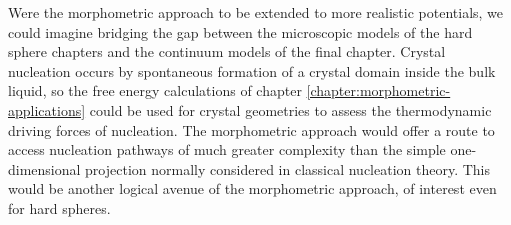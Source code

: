 \documentclass[11pt,twoside]{report}
\def\includebibliography{}
\begin{document}
Were the morphometric approach to be extended to more realistic potentials, we could imagine bridging the gap between the microscopic models of the hard sphere chapters and the continuum models of the final chapter.
Crystal nucleation occurs by spontaneous formation of a crystal domain inside the bulk liquid, so the free energy calculations of chapter \ref{chapter:morphometric-applications} could be used for crystal geometries to assess the thermodynamic driving forces of nucleation.
The morphometric approach would offer a route to access nucleation pathways of much greater complexity than the simple one-dimensional projection normally considered in classical nucleation theory.
This would be another logical avenue of the morphometric approach, of interest even for hard spheres.

\ifdefined\includebibliography
  \printbibliography
\fi
\end{document}
